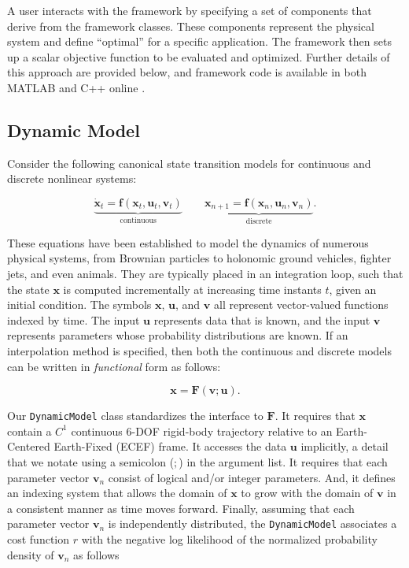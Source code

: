 A user interacts with the framework by specifying a set of components that derive from the framework classes. These components represent the physical system and define ``optimal'' for a specific application. The framework then sets up a scalar objective function to be evaluated and optimized. Further details of this approach are provided below, and framework code is available in both MATLAB and C++ online \cite{functionalnavigation}.

\subsection{Dynamic Model}\label{sec:dynamics}
Consider the following canonical state transition models for continuous and discrete nonlinear systems:

\begin{equation}
\underbrace {{\mathbf{\dot x}}_t  = {\mathbf{f}}\left( {{\mathbf{x}}_t ,{\mathbf{u}}_t ,{\mathbf{v}}_t } \right)}_{{\text{continuous}}}\quad \quad \underbrace {{\mathbf{x}}_{n + 1}  = {\mathbf{f}}\left( {{\mathbf{x}}_n ,{\mathbf{u}}_n ,{\mathbf{v}}_n } \right)}_{{\text{discrete}}}.
\end{equation}

These equations have been established to model the dynamics of numerous physical systems, from Brownian particles to holonomic ground vehicles, fighter jets, and even animals. They are typically placed in an integration loop, such that the state $\mathbf{x}$ is computed incrementally at increasing time instants $t$, given an initial condition. The symbols $\mathbf{x}$, $\mathbf{u}$, and $\mathbf{v}$ all represent vector-valued functions indexed by time. The input $\mathbf{u}$ represents data that is known, and the input $\mathbf{v}$ represents parameters whose probability distributions are known. If an interpolation method is specified, then both the continuous and discrete models can be written in \emph{functional} form as follows:

\begin{equation}
{\mathbf{x}} = {\mathbf{F}}\left( {{\mathbf{v}};{\mathbf{u}}} \right).
\end{equation}

Our \texttt{\small{DynamicModel}} class standardizes the interface to $\mathbf{F}$. It requires that $\mathbf{x}$ contain a $C^1$ continuous $6$-DOF rigid-body trajectory relative to an Earth-Centered Earth-Fixed (ECEF) frame. It accesses the data $\mathbf{u}$ implicitly, a detail that we notate using a semicolon ($;$) in the argument list. It requires that each parameter vector $\mathbf{v}_n$ consist of logical and/or integer parameters. And, it defines an indexing system that allows the domain of $\mathbf{x}$ to grow with the domain of $\mathbf{v}$ in a consistent manner as time moves forward. Finally, assuming that each parameter vector $\mathbf{v}_n$ is independently distributed, the \texttt{\small{DynamicModel}} associates a cost function $r$ with the negative log likelihood of the normalized probability density of $\mathbf{v}_n$ as follows

